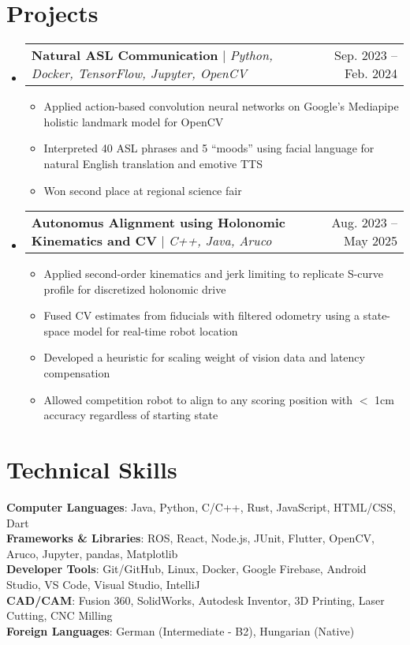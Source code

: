 \documentclass[letterpaper,11pt]{article}
\makeatletter
\newcommand{\resumeItem}[1]{
  \item\small{
    {#1 \vspace{-2pt}}
  }
}
\newcommand{\resumeProjectHeading}[2]{
    \item
    \begin{tabular*}{0.97\textwidth}{l@{\extracolsep{\fill}}r}
      \small#1 & #2 \\
    \end{tabular*}\vspace{-7pt}
}
\newcommand{\resumeSubHeadingListStart}{\begin{itemize}[leftmargin=0.15in, label={}]}
\newcommand{\resumeSubHeadingListEnd}{\end{itemize}}
\newcommand{\resumeItemListStart}{\begin{itemize}}
\newcommand{\resumeItemListEnd}{\end{itemize}\vspace{-5pt}}
\makeatother
\begin{document}
\section{Projects}
    \resumeSubHeadingListStart
      \resumeProjectHeading
          {\textbf{Natural ASL Communication} $|$ \emph{Python, Docker, TensorFlow, Jupyter, OpenCV}}{Sep. 2023 -- Feb. 2024}
          \resumeItemListStart
            \resumeItem{Applied action-based convolution neural networks on Google's Mediapipe holistic landmark model for OpenCV}
            \resumeItem{Interpreted 40 ASL phrases and 5 “moods” using facial language for natural English translation and emotive TTS}
            \resumeItem{Won second place at regional science fair}
          \resumeItemListEnd
      \resumeProjectHeading
          {\textbf{Autonomus Alignment using Holonomic Kinematics and CV} $|$ \emph{C++, Java, Aruco}}{Aug. 2023 -- May 2025}
          \resumeItemListStart
            \resumeItem{Applied second-order kinematics and jerk limiting to replicate S-curve profile for discretized holonomic drive}
            \resumeItem{Fused CV estimates from fiducials with filtered odometry using a state-space model for real-time robot location}
            \resumeItem{Developed a heuristic for scaling weight of vision data and latency compensation}
            \resumeItem{Allowed competition robot to align to any scoring position with $<$ 1cm accuracy regardless of starting state}
          \resumeItemListEnd
    \resumeSubHeadingListEnd



%
\section{Technical Skills}
 \begin{itemize}[leftmargin=0.15in, label={}]
    \small{\item{
     \textbf{Computer Languages}{: Java, Python, C/C++, Rust, JavaScript, HTML/CSS, Dart} \\
     \textbf{Frameworks \& Libraries}{: ROS, React, Node.js, JUnit, Flutter, OpenCV, Aruco, Jupyter, pandas, Matplotlib} \\
     \textbf{Developer Tools}{: Git/GitHub, Linux, Docker, Google Firebase, Android Studio, VS Code, Visual Studio, IntelliJ} \\
     \textbf{CAD/CAM}{: Fusion 360, SolidWorks, Autodesk Inventor, 3D Printing, Laser Cutting, CNC Milling} \\
     \textbf{Foreign Languages}{: German (Intermediate - B2), Hungarian (Native)}
    }}
 \end{itemize}


\end{document}
